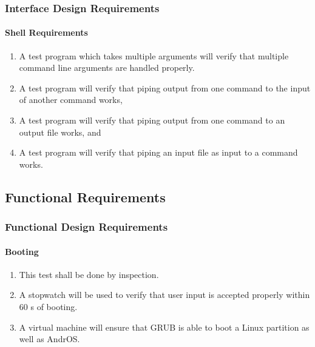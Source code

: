 \subsubsection{Interface Design Requirements}
	\paragraph{Shell Requirements}
  \begin{enumerate}
    \item A test program which takes multiple arguments will verify that multiple command line arguments 
    are handled properly.
    \item A test program will verify that piping output from one command to the input of another command works,
    \item A test program will verify that piping output from one command to an output file works, and
		\item A test program will verify that piping an input file as input to a command works.
  \end{enumerate}




\subsection{Functional Requirements}


\subsubsection{Functional Design Requirements}
  \paragraph{Booting}
  \begin{enumerate}
    \item This test shall be done by inspection.
    \item A stopwatch will be used to verify that user input is accepted properly within 60 s of booting.
    \item A virtual machine will ensure that GRUB is able to boot a Linux partition as well as AndrOS.
  \end{enumerate}
